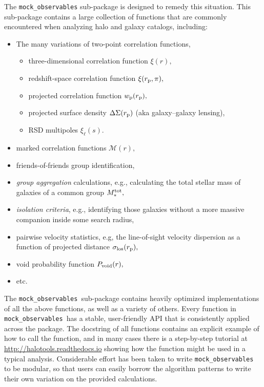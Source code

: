 \documentclass[twocolumn, tighten]{aastex6}
\newcommand{\bit}{\begin{itemize}}
\newcommand{\eit}{\end{itemize}}
\newcommand{\rproj}{r_{\rm p}}
\newcommand{\mockobs}{{\tt mock\_observables }}
\begin{document}
The {\tt mock\_observables} sub-package is designed to remedy this situation. This sub-package contains a large collection of functions that are commonly encountered when analyzing halo and galaxy catalogs, including:

\bit
\item The many variations of two-point correlation functions,
\bit
\item three-dimensional correlation function $\xi(r),$
\item redshift-space correlation function $\xi(\rproj, \pi),$
\item projected correlation function $w_{\rm p}(\rproj),$
\item projected surface density $\Delta\Sigma(r_{\rm p})$ (aka galaxy--galaxy lensing),
\item RSD multipoles $\xi_{\ell}(s).$
\eit
\item marked correlation functions $\mathcal{M}(r),$
\item friends-of-friends group identification,
\item {\em group aggregation} calculations, e.g., calculating the total stellar mass of galaxies of a common group $M_{\ast}^{\rm tot},$
\item {\em isolation criteria}, e.g., identifying those galaxies without a more massive companion inside some search radius,
\item pairwise velocity statistics, e.g, the line-of-sight velocity dispersion as a function of projected distance $\sigma_{\rm los}(\rproj),$
\item void probability function $P_{\rm void}(r),$
\item etc.
\eit

The \mockobs sub-package contains heavily optimized implementations of all the above functions, as well as a variety of others. Every function in \mockobs has a stable, user-friendly API that is consistently applied across the package. The docstring of all functions contains an explicit example of how to call the function, and in many cases there is a step-by-step tutorial at \url{http://halotools.readthedocs.io} showing how the function might be used in a typical analysis. Considerable effort has been taken to write \mockobs to be modular, so that users can easily borrow the algorithm patterns to write their own variation on the provided calculations.
\end{document}
